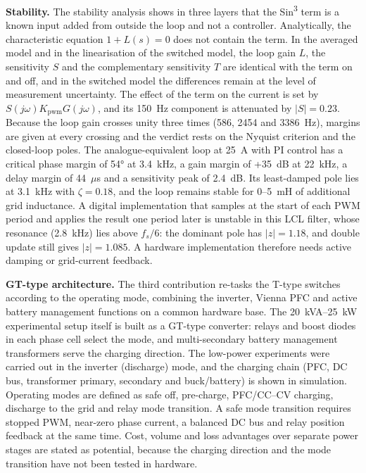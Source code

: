 \textbf{Stability.} The stability analysis shows in three layers that the Sin\textsuperscript{3} term is a known input added from outside the loop and not a controller. Analytically, the characteristic equation $1+L(s)=0$ does not contain the term. In the averaged model and in the linearisation of the switched model, the loop gain $L$, the sensitivity $S$ and the complementary sensitivity $T$ are identical with the term on and off, and in the switched model the differences remain at the level of measurement uncertainty. The effect of the term on the current is set by $S(j\omega)K_{\mathrm{pwm}}G(j\omega)$, and its 150~Hz component is attenuated by $|S|=0.23$. Because the loop gain crosses unity three times (586, 2454 and 3386~Hz), margins are given at every crossing and the verdict rests on the Nyquist criterion and the closed-loop poles. The analogue-equivalent loop at 25~A with PI control has a critical phase margin of 54° at 3.4~kHz, a gain margin of +35~dB at 22~kHz, a delay margin of 44~$\mu$s and a sensitivity peak of 2.4~dB. Its least-damped pole lies at 3.1~kHz with $\zeta=0.18$, and the loop remains stable for 0--5~mH of additional grid inductance. A digital implementation that samples at the start of each PWM period and applies the result one period later is unstable in this LCL filter, whose resonance (2.8~kHz) lies above $f_s/6$: the dominant pole has $|z|=1.18$, and double update still gives $|z|=1.085$. A hardware implementation therefore needs active damping or grid-current feedback.

\textbf{GT-type architecture.} The third contribution re-tasks the T-type switches according to the operating mode, combining the inverter, Vienna PFC and active battery management functions on a common hardware base. The 20~kVA--25~kW experimental setup itself is built as a GT-type converter: relays and boost diodes in each phase cell select the mode, and multi-secondary battery management transformers serve the charging direction. The low-power experiments were carried out in the inverter (discharge) mode, and the charging chain (PFC, DC bus, transformer primary, secondary and buck/battery) is shown in simulation. Operating modes are defined as safe off, pre-charge, PFC/CC--CV charging, discharge to the grid and relay mode transition. A safe mode transition requires stopped PWM, near-zero phase current, a balanced DC bus and relay position feedback at the same time. Cost, volume and loss advantages over separate power stages are stated as potential, because the charging direction and the mode transition have not been tested in hardware.

